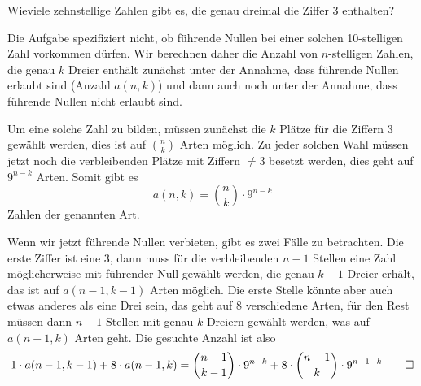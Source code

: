 Wieviele zehnstellige Zahlen gibt es, die genau dreimal die Ziffer
3 enthalten?


\begin{loesung}
Die Aufgabe spezifiziert nicht, ob führende Nullen bei einer solchen
10-stelligen Zahl
vorkommen dürfen. Wir berechnen daher die Anzahl von $n$-stelligen
Zahlen, die genau $k$ Dreier enthält zunächst unter der Annahme,
dass führende Nullen erlaubt sind (Anzahl $a(n,k)$) und dann auch
noch unter der Annahme, dass führende Nullen nicht erlaubt sind.

Um eine solche Zahl zu bilden, müssen zunächst die $k$ Plätze
für die Ziffern 3 gewählt werden, dies ist auf $\binom{n}{k}$
Arten möglich. Zu jeder solchen Wahl müssen jetzt noch die
verbleibenden Plätze mit Ziffern $\ne 3$ besetzt werden, dies
geht auf $9^{n-k}$ Arten. Somit gibt es
$$a(n,k)=\binom{n}{k}\cdot9^{n-k}$$
Zahlen der genannten Art.

Wenn wir jetzt führende Nullen verbieten, gibt es zwei Fälle zu
betrachten. Die erste Ziffer ist eine $3$, dann muss für die
verbleibenden $n-1$ Stellen eine Zahl möglicherweise mit führender
Null gewählt werden, die genau $k-1$ Dreier erhält, das ist auf $a(n-1,k-1)$
Arten möglich. Die erste Stelle könnte aber auch etwas anderes
als eine Drei sein, das geht auf $8$ verschiedene Arten, für den
Rest müssen dann $n-1$ Stellen mit genau $k$ Dreiern gewählt
werden, was auf $a(n-1,k)$ Arten geht. Die gesuchte Anzahl ist also
\[
1\cdot a(n-1,k-1) + 8\cdot a(n-1,k)=
\binom{n-1}{k-1}\cdot 9^{n-k}+8\cdot\binom{n-1}{k}\cdot 9^{n-1-k}
\qedhere
\]
\end{loesung}

